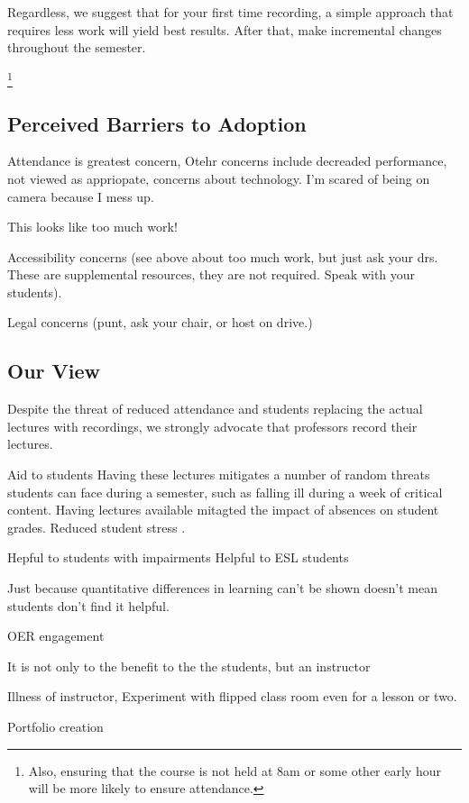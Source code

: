 \documentclass[sigconf]{acmart}
\begin{document}
Regardless, we suggest that for your first time recording, a simple approach that requires less work will yield best results.  
After that, make incremental changes throughout the semester.

\footnote{Also, ensuring that the course is not held at 8am or some other early hour will be more likely to ensure attendance.}

\subsection{Perceived Barriers to Adoption}
Attendance is greatest concern,\cite{maynor2013student}
Otehr concerns include decreaded performance, not viewed as appriopate, concerns about technology.\cite{maynor2013student}
I'm scared of being on camera because I mess up.

This looks like too much work!

Accessibility concerns (see above about too much work, but just ask your drs.  These are supplemental resources, they are not required.  Speak with your students).

Legal concerns (punt, ask your chair, or host on drive.)


\subsection{Our View}
Despite the threat of reduced attendance and students replacing the actual lectures with recordings, we strongly advocate that professors record their lectures.


Aid to students
Having these lectures mitigates a number of random threats students can face during a semester, such as falling ill during a week of critical content.
Having lectures available mitagted the impact of absences on student grades\cite{traphagan2010impact}.
Reduced student stress \cite{traphagan2010impact}.

Hepful to students with impairments 
Helpful to ESL students


Just because quantitative differences in learning can't be shown doesn't mean students don't find it helpful.


OER engagement \cite{llamas2014generating}


It is not only to the benefit to the the students, but an instructor

Illness of instructor, 
Experiment with flipped class room even for a lesson or two.

Portfolio creation
\end{document}
